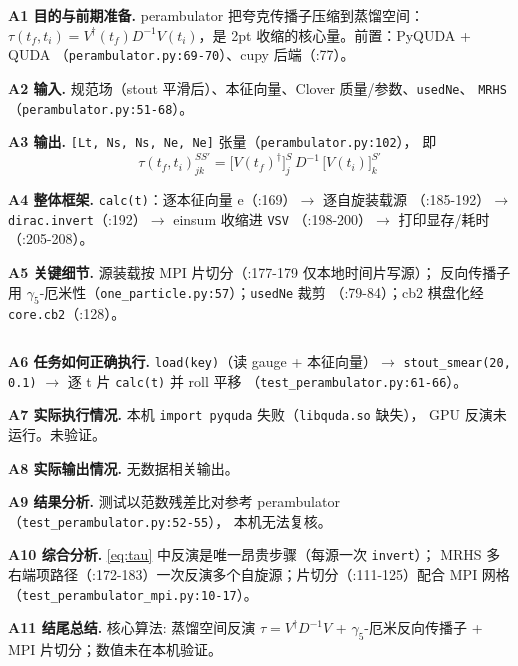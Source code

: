 \documentclass[UTF8]{ctexart}
\begin{document}
\textbf{A1 目的与前期准备.} perambulator 把夸克传播子压缩到蒸馏空间：$\tau(t_f,t_i) = 
V^\dagger(t_f) D^{-1} V(t_i)$，是 2pt 收缩的核心量。前置：PyQUDA + QUDA
（\texttt{\nolinkurl{perambulator.py:69-70}}）、cupy 后端（:77）。

\textbf{A2 输入.} 规范场（stout 平滑后）、本征向量、Clover 质量/参数、\texttt{usedNe}、
\texttt{MRHS}（\texttt{\nolinkurl{perambulator.py:51-68}}）。

\textbf{A3 输出.} \texttt{[Lt, Ns, Ns, Ne, Ne]} 张量（\texttt{\nolinkurl{perambulator.py:102}}），
即
\begin{equation}\label{eq:tau}
  \tau(t_f,t_i)^{SS'}_{jk} = \big[V(t_f)^\dagger\big]^{S}_{j}\, D^{-1}\, \big[V(t_i)\big]^{S'}_{k}
\end{equation}

\textbf{A4 整体框架.} \texttt{calc(t)}：逐本征向量 e（:169）$\to$ 逐自旋装载源
（:185-192）$\to$ \texttt{\nolinkurl{dirac.invert}}（:192）$\to$ einsum 收缩进 \texttt{VSV}
（:198-200）$\to$ 打印显存/耗时（:205-208）。

\textbf{A5 关键细节.} 源装载按 MPI 片切分（:177-179 仅本地时间片写源）；
反向传播子用 $\gamma_5$-厄米性（\texttt{\nolinkurl{one_particle.py:57}}）；\texttt{usedNe} 裁剪
（:79-84）；cb2 棋盘化经 \texttt{\nolinkurl{core.cb2}}（:128）。

\begin{lstlisting}[language=python,firstline=146,lastline=175]
\end{lstlisting}

\textbf{A6 任务如何正确执行.} \texttt{load(key)}（读 gauge + 本征向量）$\to$
\texttt{stout\_smear(20, 0.1)} $\to$ 逐 t 片 \texttt{calc(t)} 并 roll 平移
（\texttt{\nolinkurl{test_perambulator.py:61-66}}）。

\textbf{A7 实际执行情况.} 本机 \texttt{import pyquda} 失败（\texttt{\nolinkurl{libquda.so}} 缺失），
GPU 反演未运行。\textcolor{warn}{未验证}。

\textbf{A8 实际输出情况.} 无数据相关输出。

\textbf{A9 结果分析.} 测试以范数残差比对参考 perambulator（\texttt{\nolinkurl{test_perambulator.py:52-55}}），
本机无法复核。

\textbf{A10 综合分析.} \eqref{eq:tau} 中反演是唯一昂贵步骤（每源一次 \texttt{invert}）；
MRHS 多右端项路径（:172-183）一次反演多个自旋源；片切分（:111-125）配合 MPI 网格
（\texttt{\nolinkurl{test_perambulator_mpi.py:10-17}}）。

\textbf{A11 结尾总结.} \textcolor{algo}{核心算法:} 蒸馏空间反演 $\tau=V^\dagger D^{-1}V$
+ $\gamma_5$-厄米反向传播子 + MPI 片切分；数值未在本机验证。
\end{document}
